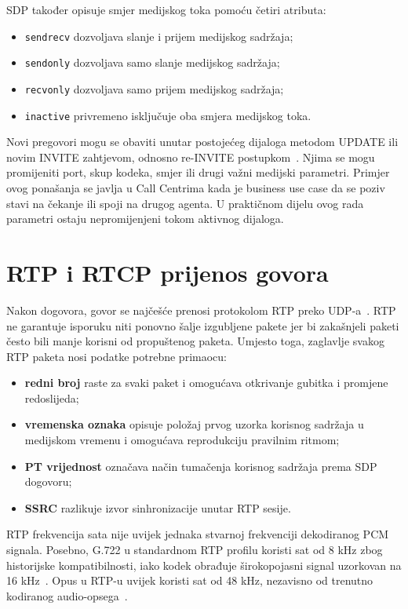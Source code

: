SDP također opisuje smjer medijskog toka pomoću četiri atributa:

\begin{itemize}
    \item \texttt{sendrecv} dozvoljava slanje i prijem medijskog sadržaja;
    \item \texttt{sendonly} dozvoljava samo slanje medijskog sadržaja;
    \item \texttt{recvonly} dozvoljava samo prijem medijskog sadržaja;
    \item \texttt{inactive} privremeno isključuje oba smjera medijskog toka.
\end{itemize}

Novi pregovori mogu se obaviti unutar postojećeg dijaloga metodom UPDATE ili novim INVITE zahtjevom, odnosno re-INVITE postupkom~\cite{rfc3261,rfc3311}. Njima se mogu promijeniti port, skup kodeka, smjer ili drugi važni medijski parametri. Primjer ovog ponašanja se javlja u Call Centrima kada je business use case da se poziv stavi na čekanje ili spoji na drugog agenta. U praktičnom dijelu ovog rada parametri ostaju nepromijenjeni tokom aktivnog dijaloga.

\section{RTP i RTCP prijenos govora}

Nakon dogovora, govor se najčešće prenosi protokolom RTP preko UDP-a~\cite{rfc3550}. RTP ne garantuje isporuku niti ponovno šalje izgubljene pakete jer bi zakašnjeli paketi često bili manje korisni od propuštenog paketa. Umjesto toga, zaglavlje svakog RTP paketa nosi podatke potrebne primaocu:

\begin{itemize}
    \item \textbf{redni broj} raste za svaki paket i omogućava otkrivanje gubitka i promjene redoslijeda;
    \item \textbf{vremenska oznaka} opisuje položaj prvog uzorka korisnog sadržaja u medijskom vremenu i omogućava reprodukciju pravilnim ritmom;
    \item \textbf{PT vrijednost} označava način tumačenja korisnog sadržaja prema SDP dogovoru;
    \item \textbf{SSRC} razlikuje izvor sinhronizacije unutar RTP sesije.
\end{itemize}

RTP frekvencija sata nije uvijek jednaka stvarnoj frekvenciji dekodiranog PCM signala. Posebno, G.722 u standardnom RTP profilu koristi sat od 8 kHz zbog historijske kompatibilnosti, iako kodek obrađuje širokopojasni signal uzorkovan na 16 kHz~\cite{rfc3551}. Opus u RTP-u uvijek koristi sat od 48 kHz, nezavisno od trenutno kodiranog audio-opsega~\cite{rfc7587}.

